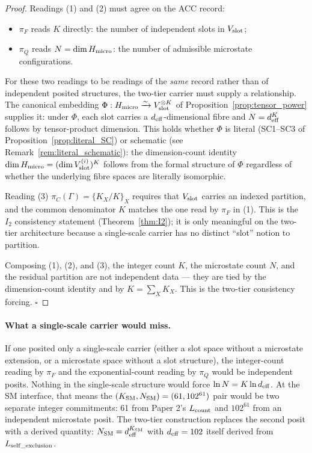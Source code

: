\documentclass[11pt]{article}
\theoremstyle{plain}
\theoremstyle{definition}
\theoremstyle{remark}
\begin{document}
\begin{proof}
Readings (1) and (2) must agree on the ACC record:
\begin{itemize}[leftmargin=2em,itemsep=2pt]
  \item $\pi_F$ reads $K$ directly: the number of independent slots in $V_{\rm slot}$;
  \item $\pi_Q$ reads $N = \dim H_{\rm micro}$: the number of admissible microstate configurations.
\end{itemize}
For these two readings to be readings of the \emph{same} record rather than of independent posited structures, the two-tier carrier must supply a relationship.  The canonical embedding $\Phi : H_{\rm micro} \xrightarrow{\sim} V_{\rm slot}^{\otimes K}$ of Proposition~\ref{prop:tensor_power} supplies it: under $\Phi$, each slot carries a $d_{\rm eff}$-dimensional fibre and $N = d_{\rm eff}^K$ follows by tensor-product dimension.  This holds whether $\Phi$ is literal (SC1--SC3 of Proposition~\ref{prop:literal_SC}) or schematic (see Remark~\ref{rem:literal_schematic}): the dimension-count identity $\dim H_{\rm micro} = (\dim V_{\rm slot}^{(i)})^K$ follows from the formal structure of $\Phi$ regardless of whether the underlying fibre spaces are literally isomorphic.

Reading (3) $\pi_C(\Gamma) = \{K_X/K\}_X$ requires that $V_{\rm slot}$ carries an indexed partition, and the common denominator $K$ matches the one read by $\pi_F$ in (1).  This is the $I_2$ consistency statement (Theorem~\ref{thm:I2}); it is only meaningful on the two-tier architecture because a single-scale carrier has no distinct ``slot'' notion to partition.

Composing (1), (2), and (3), the integer count $K$, the microstate count $N$, and the residual partition are not independent data --- they are tied by the dimension-count identity and by $K = \sum_X K_X$.  This is the two-tier consistency forcing.  $\square$
\end{proof}

\paragraph{What a single-scale carrier would miss.}  If one posited only a single-scale carrier (either a slot space without a microstate extension, or a microstate space without a slot structure), the integer-count reading by $\pi_F$ and the exponential-count reading by $\pi_Q$ would be independent posits.  Nothing in the single-scale structure would force $\ln N = K \ln d_{\rm eff}$.  At the SM interface, that means the $(K_{\rm SM}, N_{\rm SM}) = (61, 102^{61})$ pair would be two separate integer commitments: 61 from Paper 2's $L_{\rm count}$ and $102^{61}$ from an independent microstate posit.  The two-tier construction replaces the second posit with a derived quantity: $N_{\rm SM} = d_{\rm eff}^{K_{\rm SM}}$ with $d_{\rm eff} = 102$ itself derived from $L_{\rm self\_exclusion}$.
\end{document}
